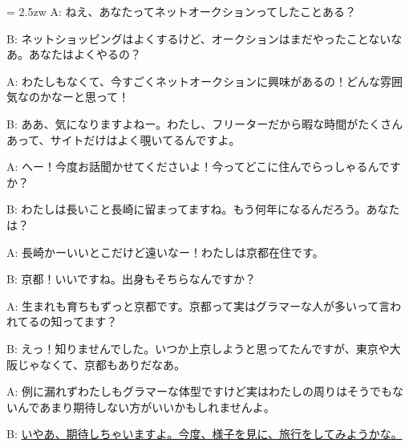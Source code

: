 \documentclass[11pt]{amsart}
\title{}
\author{}
\newenvironment{hangall}[1]{\hangindent = 2.5zw\everypar{\hangindent = 2.5zw}}{}
\begin{document}
\maketitle
\begin{hangall}{}%
A: ねえ、あなたってネットオークションってしたことある？

B: ネットショッピングはよくするけど、オークションはまだやったことないなあ。あなたはよくやるの？

A: わたしもなくて、今すごくネットオークションに興味があるの！どんな雰囲気なのかなーと思って！

B: ああ、気になりますよねー。わたし、フリーターだから暇な時間がたくさんあって、サイトだけはよく覗いてるんですよ。

A: へー！今度お話聞かせてくださいよ！今ってどこに住んでらっしゃるんですか？

B: わたしは長いこと長崎に留まってますね。もう何年になるんだろう。あなたは？

A: 長崎かーいいとこだけど遠いなー！わたしは京都在住です。

B: 京都！いいですね。出身もそちらなんですか？

A: 生まれも育ちもずっと京都です。京都って実はグラマーな人が多いって言われてるの知ってます？

B: えっ！知りませんでした。いつか上京しようと思ってたんですが、東京や大阪じゃなくて、京都もありだなあ。

A: 例に漏れずわたしもグラマーな体型ですけど実はわたしの周りはそうでもないんであまり期待しない方がいいかもしれませんよ。

B: \ul{いやあ、期待しちゃいますよ。今度、様子を見に、旅行をしてみようかな。}\end{hangall}
\end{document}

